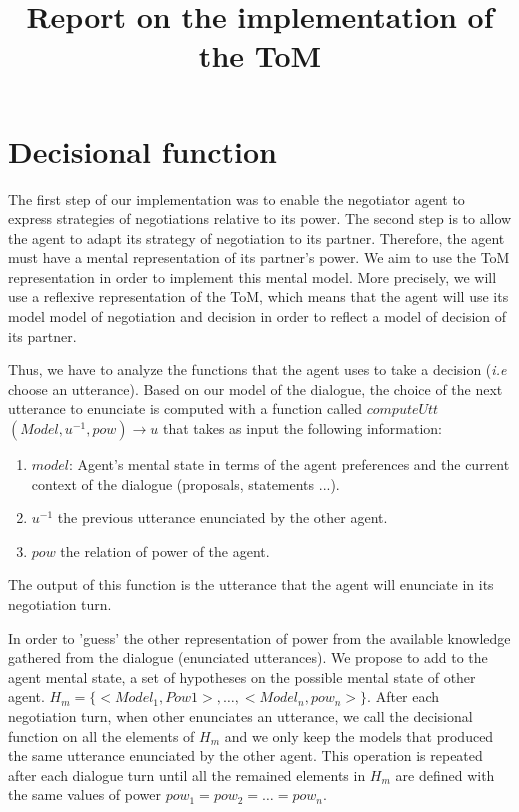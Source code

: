 \documentclass{llncs}
\begin{document}
\title{\vskip -10pt Report on the implementation of the ToM}

\maketitle 

\section{Decisional function}

The first step of our implementation was to enable the negotiator agent to express strategies of negotiations relative to its power. The second step is to allow the agent to adapt its strategy of negotiation to its partner. Therefore, the agent must have a mental representation of its partner's power. We aim to use the ToM representation in order to implement this mental model. More precisely, we will use a reflexive representation of the ToM, which means that the agent will use its model model of negotiation and decision in order to reflect a model of decision of its partner.  
 
 
Thus, we have to analyze the functions that the agent uses to take a decision (\emph{i.e} choose an utterance). Based on our model of the dialogue, the choice of the next utterance to enunciate is computed with a function called 
$computeUtt$ $(Model, u^{-1}, pow) \rightarrow u$ that takes as input the following information:
\begin{enumerate}
	\item $model$: Agent's mental state in terms of the agent preferences and the current context of the dialogue (proposals, statements ...).
	
	\item $u^{-1}$ the previous utterance enunciated by the other agent.
	
	\item $pow$ the relation of power of the agent. 

\end{enumerate}
The output of this function is the utterance that the agent will enunciate in its negotiation turn.


In order to 'guess' the other representation of power from the available knowledge gathered from the dialogue (enunciated utterances). We propose to add to the agent mental state, a set of hypotheses on the possible mental state of other agent. $H_m= \{<Model_1, Pow1>, \ldots, <Model_n, pow_n> \}$. After each negotiation turn, when other enunciates an utterance, we call the decisional function on all the elements of $H_m$ and we only keep the models that produced the same utterance enunciated by the other agent.
This operation is repeated after each dialogue turn until all the remained elements in $H_m$ are defined with the same values of power $pow_1 = pow_2 = \ldots = pow_n$.
\end{document}
